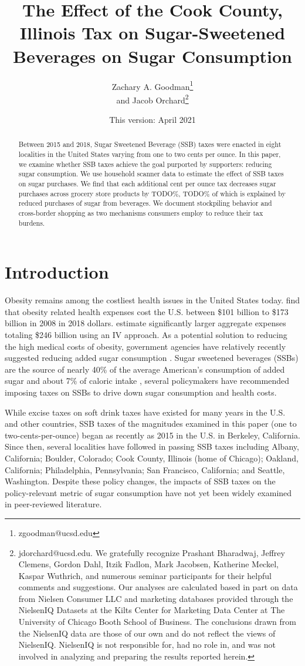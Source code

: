 \documentclass[12pt]{article}
\title{The Effect of the Cook County, Illinois Tax on Sugar-Sweetened Beverages on Sugar Consumption}
\author{Zachary A. Goodman\thanks{zgoodman@ucsd.edu}\\ and Jacob Orchard\thanks{jdorchard@ucsd.edu. We gratefully recognize Prashant Bharadwaj, Jeffrey Clemens, Gordon Dahl, Itzik Fadlon, Mark Jacobsen, Katherine Meckel, Kaspar Wuthrich, and numerous seminar participants for their helpful comments and suggestions. Our analyses are calculated based in part on data from Nielsen Consumer LLC and marketing databases provided through the NielsenIQ Datasets at the Kilts Center for Marketing Data Center at The University of Chicago Booth School of Business. The conclusions drawn from the NielsenIQ data are those of our own and do not reflect the views of NielsenIQ. NielsenIQ is not responsible for, had no role in, and was not involved in analyzing and preparing the results reported herein.}}
\affil{University of California, San Diego}
\date{This version: April 2021}
\begin{document}
\maketitle

\begin{abstract}
Between 2015 and 2018, Sugar Sweetened Beverage (SSB) taxes were enacted in eight localities in the United States varying from one to two cents per ounce. In this paper, we examine whether SSB taxes achieve the goal purported by supporters: reducing sugar consumption. We use household scanner data to estimate the effect of SSB taxes on sugar purchases. We find that each additional cent per ounce tax decreases sugar purchases across grocery store products by TODO\%, TODO\% of which is explained by reduced purchases of sugar from beverages. We document stockpiling behavior and cross-border shopping as two mechanisms consumers employ to reduce their tax burdens.
\end{abstract}

\pagebreak

\doublespacing

\section{Introduction} \label{introduction}

Obesity remains among the costliest health issues in the United States today. \textcite{finkelstein2009annual} find that obesity related health expenses cost the U.S. between \$101 billion to \$173 billion in 2008 in 2018 dollars. \textcite{cawley2012medical} estimate significantly larger aggregate expenses totaling \$246 billion using an IV approach.  As a potential solution to reducing the high medical costs of obesity, government agencies have relatively recently suggested reducing added sugar consumption \parencite{dietary2015dietary}. Sugar sweetened beverages (SSBs) are the source of nearly 40\% of the average American's consumption of added sugar \parencite{dietary2015dietary} and about 7\% of caloric intake \parencite{allcott2019should}, several policymakers have recommended imposing taxes on SSBs to drive down sugar consumption and health costs.

While excise taxes on soft drink taxes have existed for many years in the U.S. and other countries, SSB taxes of the magnitudes examined in this paper (one to two-cents-per-ounce) began as recently as 2015 in the U.S. in Berkeley, California. Since then, several localities have followed in passing SSB taxes including Albany, California; Boulder, Colorado; Cook County, Illinois (home of Chicago); Oakland, California; Philadelphia, Pennsylvania; San Francisco, California; and Seattle, Washington. Despite these policy changes, the impacts of SSB taxes on the policy-relevant metric of sugar consumption have not yet been widely examined in peer-reviewed literature.
\end{document}
